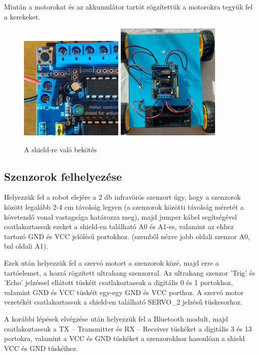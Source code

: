 \documentclass[]{thesis-ekf}
\theoremstyle{definition}
\begin{document}
Miután a motorokat és az akkumulátor tartót rögzítettük a motorokra tegyük fel a kerekeket.
\begin{figure}[h]
	\centering
	\includegraphics[width=5cm]{images/robot_build/akku-connect}
	\includegraphics[width=5cm]{images/robot_build/shieldre-bekotes}
	\caption{A shield-re való bekötés}
	\label{shieldre-bekotes}
\end{figure}

\subsection{Szenzorok felhelyezése}
Helyezzük fel a robot elejére a 2 db infravörös szenzort úgy, hogy a szenzorok között legalább 2-4 cm távolság legyen (a szenzorok közötti távolság méretét a követendő vonal vastagsága határozza meg), majd jumper kábel segítségével csatlakoztassuk ezeket a shield-en található A0 és A1-es, valamint az ehhez tartozó GND és VCC jelölésű portokhoz. (szemből nézve jobb oldali szenzor A0, bal oldali A1).

Ezek után helyezzük fel a szervó motort a szenzorok közé, majd erre a tartóelemet, a hozzá rögzített ultrahang szenzorral. Az ultrahang szenzor ’Trig’ és ’Echo’ jelzéssel ellátott tüskéit csatlakoztassuk a digitális 0 és 1 portokhoz, valamint GND és VCC tüskéit egy-egy GND és VCC porthoz. A szervó motor vezetékét csatlakoztassuk a shield-en található SERVO\_2 jelzésű tüskesorhoz.

A korábbi lépések elvégzése után helyezzük fel a Bluetooth modult, majd csatlakoztassuk a TX -- Transmitter és RX -- Receiver tüskéket a digitális 3 és 13 portokra, valamint a VCC és GND tüskéket a szenzorokhoz hasonlóan a shield VCC és GND tüskéihez.
\end{document}
